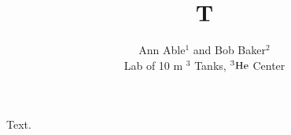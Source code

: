 \documentclass{article}
\begin{document}
\title{T}
\author{Ann Able$^{1}$ and Bob Baker$^{2}$\\ Lab of 10 m $^{3}$ Tanks, ${\rm ^{3}He}$ Center}
\maketitle
Text.
\end{document}
